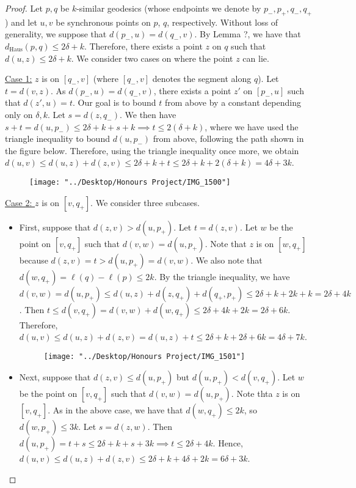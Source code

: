 \documentclass[12pt]{article}
\newcommand{\vs}{\vskip10pt}
\begin{document}
	\begin{proof}
		
		Let $p,q$ be $k$-similar geodesics (whose endpoints we denote by $p_{-}, p_{+}, q_{-}, q_{+}$) and let $u,v$ be synchronous points on $p$, $q$, respectively. Without loss of generality, we suppose that $d(p_{-}, u) = d(q_{-}, v)$. By Lemma ?, we have that $d_{\text{Haus}}(p,q) \leq 2\delta + k$. Therefore, there exists a point $z$ on $q$ such that $d(u,z) \leq 2\delta + k$. We consider two cases on where the point $z$ can lie. 
		
		\vs 
		
		\underline{Case 1:} $z$ is on $[q_{-}, v]$ (where $[q_{-}, v]$ denotes the segment along $q$). Let $t = d(v,z)$. As $d(p_{-}, u) = d(q_{-}, v)$, there exists a point $z'$ on $[p_{-}, u]$ such that $d(z', u) = t$. Our goal is to bound $t$ from above by a constant depending only on $\delta, k$. Let $s = d(z, q_{-})$. We then have $s + t = d(u, p_{-}) \leq 2 \delta + k + s + k \implies t \leq 2(\delta + k)$, where we have used the triangle inequality to bound $d(u, p_{-})$ from above, following the path shown in the figure below. Therefore, using the triangle inequality once more, we obtain $d(u,v) \leq d(u,z) + d(z,v) \leq 2\delta + k + t \leq 2\delta + k + 2(\delta + k) = 4\delta + 3k$. 
		
		
\begin{figure} [h]
	\centering
	\texttt{[image: "../Desktop/Honours Project/IMG\_1500"]}
	\caption{}
	\label{fig:img1500}
\end{figure}
		
		\vs 
		
		\underline{Case 2: } $z$ is on $[v, q_{+}]$. We consider three subcases. 
		
		\begin{itemize}
			\item First, suppose that $d(z, v) > d(u, p_{+})$. Let $t = d(z,v)$. Let $w$ be the point on $[v, q_{+}]$ such that $d(v, w) = d(u, p_{+})$. Note that $z$ is on $[w, q_{+}]$ because $d(z,v) = t > d(u, p_{+}) = d(v,w)$. We also note that $d(w, q_{+}) = \ell(q) - \ell(p) \leq 2k$. By the triangle inequality, we have $d(v,w) = d(u, p_{+}) \leq d(u, z) + d(z, q_{+}) + d(q_{+}, p_{+}) \leq 2 \delta + k + 2k + k = 2 \delta + 4k$. Then $t \leq d(v, q_{+}) = d(v,w) + d(w, q_{+}) \leq 2 \delta + 4k + 2k = 2 \delta + 6k$. Therefore, $d(u,v) \leq d(u,z) + d(z,v) = d(u,z) + t \leq 2 \delta + k + 2 \delta + 6k = 4 \delta + 7k$.
			
\begin{figure}[h]
	\centering
	\texttt{[image: "../Desktop/Honours Project/IMG\_1501"]}
	\caption{}
	\label{fig:img1501}
\end{figure}
			\item Next, suppose that $d(z, v) \leq d(u, p_{+})$ but $d(u, p_{+}) < d(v, q_{+})$. Let $w$ be the point on $[v, q_{+}]$ such that $d(v, w) = d(u, p_{+})$. Note thta $z$ is on $[v, q_{+}]$. As in the above case, we have that $d(w, q_{+}) \leq 2k$, so $d(w, p_{+}) \leq 3k$. Let $s = d(z, w)$. Then $d(u, p_{+}) = t + s \leq 2\delta + k + s + 3k \implies t \leq 2 \delta + 4k$. Hence, $d(u,v) \leq d(u,z) + d(z,v) \leq 2 \delta + k + 4 \delta + 2k = 6 \delta + 3k$. 
			

\end{itemize}
\end{proof}
\end{document}
